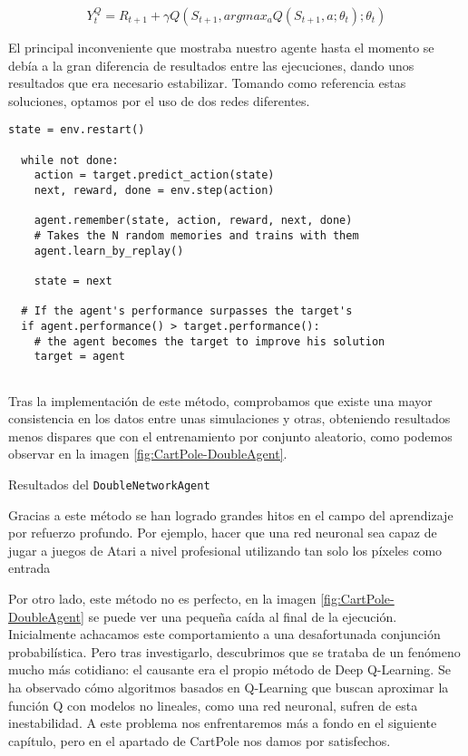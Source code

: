 $$Y^Q_{t} = R_{t+1} + \gamma Q(S_{t+1}, argmax_{a} Q(S_{t+1}, a; \theta_{t}); \theta_{t})$$

El principal inconveniente que mostraba nuestro agente hasta el momento se debía a la gran diferencia de resultados entre las ejecuciones, dando unos resultados que era necesario estabilizar. Tomando como referencia estas soluciones, optamos por el uso de dos redes diferentes.

\begin{minipage}{0.9\linewidth}%
\begin{lstlisting}[frame=tb, caption=Pseudocódigo DoubleAgent, inputencoding=latin1, label=code:cartpole_drl4]
  state = env.restart()

  while not done:
    action = target.predict_action(state)
    next, reward, done = env.step(action)

    agent.remember(state, action, reward, next, done)
    # Takes the N random memories and trains with them
    agent.learn_by_replay()

    state = next

  # If the agent's performance surpasses the target's
  if agent.performance() > target.performance():
    # the agent becomes the target to improve his solution
    target = agent
        
\end{lstlisting}%
\end{minipage}

Tras la implementación de este método, comprobamos que existe una mayor consistencia en los datos entre unas simulaciones y otras, obteniendo resultados menos dispares que con el entrenamiento por conjunto aleatorio, como podemos observar en la imagen \ref{fig:CartPole-DoubleAgent}.

%
       {Resultados del \texttt{DoubleNetworkAgent}}

Gracias a este método se han logrado grandes hitos en el campo del aprendizaje por refuerzo profundo. Por ejemplo, hacer que una red neuronal sea capaz de jugar a juegos de Atari a nivel profesional utilizando tan solo los píxeles como entrada \citep{mnih2013playing}

Por otro lado, este método no es perfecto, en la imagen \ref{fig:CartPole-DoubleAgent} se puede ver una pequeña caída al final de la ejecución. Inicialmente achacamos este comportamiento a una desafortunada conjunción probabilística. Pero tras investigarlo, descubrimos que se trataba de un fenómeno mucho más cotidiano: el causante era el propio método de Deep Q-Learning. Se ha observado cómo algoritmos basados en Q-Learning que buscan aproximar la función Q con modelos no lineales, como una red neuronal, sufren de esta inestabilidad. A este problema nos enfrentaremos más a fondo en el siguiente capítulo, pero en el apartado de CartPole nos damos por satisfechos. 

